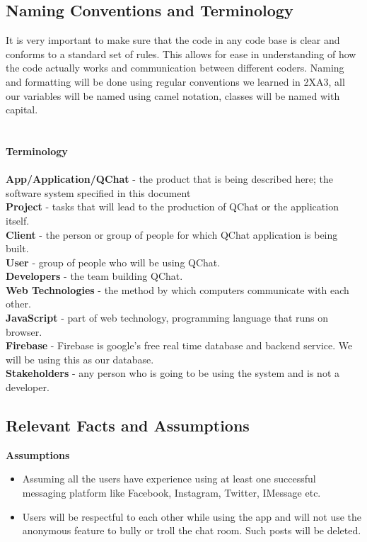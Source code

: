 \documentclass[12pt, titlepage]{article}
\begin{document}
\subsection{Naming Conventions and Terminology}


It is very important to make sure that the code in any code base is clear and conforms to a standard set of rules. This allows for ease in understanding of how the code actually works and communication between different coders. Naming and formatting will be done using regular conventions we learned in 2XA3, all our variables will be named using camel notation, classes will be named with capital.
\\
\\
\\
\textbf{Terminology} \\
\\
\textbf{App/Application/QChat} - the product that is being described here; the software system specified in this document \\
\textbf{Project} - tasks that will lead to the production of QChat or the application itself. \\
\textbf{Client} - the person or group of people for which QChat application is being built. \\
\textbf{User} - group of people who will be using QChat. \\
\textbf{Developers} - the team building QChat. \\
\textbf{Web Technologies} - the method by which computers communicate with each other. \\
\textbf{JavaScript} - part of web technology, programming language that runs on browser. \\
\textbf{Firebase} - Firebase is google’s free real time database and backend service. We will be using this as our database. \\
\textbf{Stakeholders} - any person who is going to be using the system and is not a developer.\\

\subsection{Relevant Facts and Assumptions}
\textbf{Assumptions}
\begin{itemize}
    \item Assuming all the users have experience using at least one successful messaging platform like Facebook, Instagram, Twitter, IMessage etc.
    \item Users will be respectful to each other while using the app and will not use the anonymous feature to bully or troll the chat room. Such posts will be deleted.
\end{itemize}
\end{document}
